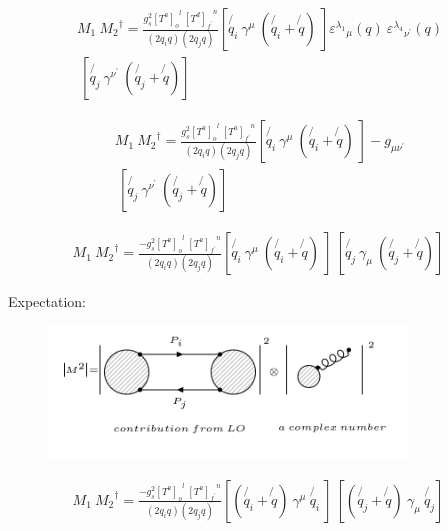 
\begin{equation}
\begin{split}
M_1\: {M_2}^{\dagger} = \frac{g_s^2 {[T^a]_o}^l \:{[T^d]_{f^{\prime}}}^n }{(2q_i q)(2q_j q)} [\not{q_i}\: \gamma^{\mu} \: (\not{q_i} + \not{q})\: ]{\varepsilon^{\lambda_1}}_{\mu} (q) \: {\varepsilon^{\lambda_4}}_{{\nu}^{\prime}} (q) \\
\:[\not{q_j} \:\gamma^{{\nu}^{\prime}} \: (\not{q_j} + \not{q})]\:
\end{split}
\end{equation}

\begin{equation}
\begin{split}
M_1\: {M_2}^{\dagger} = \frac{g_s^2 {[T^a]_o}^l \:{[T^a]_{f^{\prime}}}^n }{(2q_i q)(2q_j q)} [\not{q_i}\: \gamma^{\mu} \: (\not{q_i} + \not{q})\: ] -g_{{\mu}{{\nu}^{\prime}}} \\
\:[\not{q_j} \:\gamma^{{\nu}^{\prime}} \: (\not{q_j} + \not{q})]\:
\end{split}
\end{equation}



\begin{equation}
\begin{split}
M_1\: {M_2}^{\dagger} = \frac{-g_s^2 {[T^a]_o}^l \:{[T^a]_{f^{\prime}}}^n }{(2q_i q)(2q_j q)} [\not{q_i}\: \gamma^{\mu} \: (\not{q_i} + \not{q})\: ]
\:[\not{q_j} \:\gamma_{\mu} \: (\not{q_j} + \not{q})]\:
\end{split}
\end{equation}


Expectation:
\begin{figure}[h!]
\centering
\includegraphics[width=0.85\textwidth]{images/QQ/expectationM1M2dagger.png}
\end{figure}


\begin{equation}
\begin{split}
M_1\: {M_2}^{\dagger} = \frac{-g_s^2 {[T^a]_o}^l \:{[T^a]_{f^{\prime}}}^n }{(2q_i q)(2q_j q)} [(\not{q_i} + \not{q})\: \gamma^{\mu} \:  \not{q_i}\:]
\:[(\not{q_j} + \not{q}) \:\gamma_{\mu} \:\not{q_j} ]\:
\end{split}
\end{equation}

